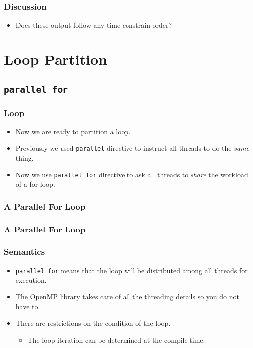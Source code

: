 \documentclass{beamer}
\begin{document}
\begin{frame}
\frametitle{Discussion}
\begin{itemize}
\item Does these output follow any time constrain order?
\end{itemize}
\end{frame}

\section{Loop Partition}

\subsection{\tt parallel for}

\begin{frame}
\frametitle{Loop}
\begin{itemize}
\item Now we are ready to partition a loop.
\item Previously we used {\tt parallel} directive to instruct all
  threads to do the {\em same} thing.
\item Now we use {\tt parallel for} directive to ask all threads to
  {\em share} the workload of a for loop.
\end{itemize}
\end{frame}

\begin{frame}
\frametitle{A Parallel For Loop}
\end{frame}

\begin{frame}
\frametitle{A Parallel For Loop}
\frametitle{Semantics}
\begin{itemize}
\item {\tt parallel for} means that the loop will be distributed among
  all threads for execution.
\item The OpenMP library takes care of all the threading details so
  you do not have to.
\item There are restrictions on the condition of the loop.  
\begin{itemize}
\item The loop iteration can be determined at the compile time.
\end{itemize}
\end{itemize}
\end{frame}
\end{document}
